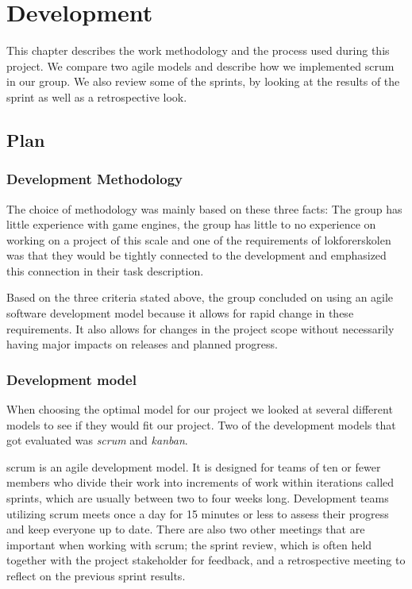 \chapter{Development}

This chapter describes the work methodology and the process used during this project. We compare two agile models and describe how we implemented scrum in our group. We also review some of the sprints, by looking at the results of the sprint as well as a retrospective look.

\section{Plan}

\subsection{Development Methodology}
The choice of methodology was mainly based on these three facts: The group has little experience with game engines, the group has little to no experience on working on a project of this scale and one of the requirements of \Gls{lokforerskolen} was that they would be tightly connected to the development and emphasized this connection in their task description.

Based on the three criteria stated above, the group concluded on using an agile software development model because it allows for rapid change in these requirements. It also allows for changes in the project scope without necessarily having major impacts on releases and planned progress.

\subsection{Development model}
When choosing the optimal model for our project we looked at several different models to see if they would fit our project. Two of the development models that got evaluated was \textit{\Gls{scrum}} and \textit{\Gls{kanban}}.

\Gls{scrum} is an agile development model. It is designed for teams of ten or fewer members who divide their work into increments of work within iterations called \gls{sprint}s, which are usually between two to four weeks long.\cite{atlassian_scrum_vs_kanban} Development teams utilizing \gls{scrum} meets once a day for 15 minutes or less to assess their progress and keep everyone up to date. There are also two other meetings that are important when working with \gls{scrum}; the \gls{sprint} review, which is often held together with the project stakeholder for feedback, and a retrospective meeting to reflect on the previous \gls{sprint} results.

